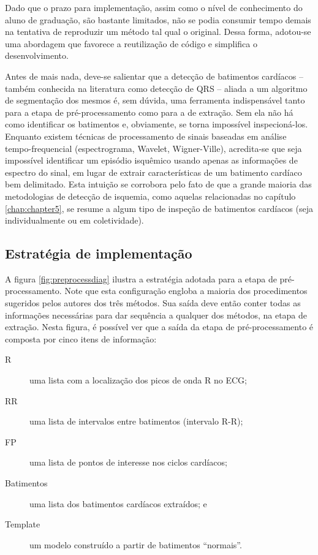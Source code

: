 Dado que o prazo para implementação, assim como o nível de conhecimento do aluno de graduação, são bastante limitados, não se podia consumir tempo demais na tentativa de reproduzir um método tal qual o original. Dessa forma, adotou-se uma abordagem que favorece a reutilização de código e simplifica o desenvolvimento.

Antes de mais nada, deve-se salientar que a detecção de batimentos cardíacos -- também conhecida na literatura como detecção de QRS -- aliada a um algoritmo de segmentação dos mesmos é, sem dúvida, uma ferramenta indispensável tanto para a etapa de pré-processamento como para a de extração. Sem ela não há como identificar os batimentos e, obviamente, se torna impossível inspecioná-los. Enquanto existem técnicas de processamento de sinais baseadas em análise tempo-frequencial (espectrograma, Wavelet, Wigner-Ville), acredita-se que seja impossível identificar um episódio isquêmico usando apenas as informações de espectro do sinal, em lugar de extrair características de um batimento cardíaco bem delimitado. Esta intuição se corrobora pelo fato de que a grande maioria das metodologias de detecção de isquemia, como aquelas relacionadas no capítulo \ref{chap:chapter5}, se resume a algum tipo de inspeção de batimentos cardíacos (seja individualmente ou em coletividade).

\subsection*{Estratégia de implementação}

A figura \ref{fig:preprocessdiag} ilustra a estratégia adotada para a etapa de pré-processamento. Note que esta configuração engloba a maioria dos procedimentos sugeridos pelos autores dos três métodos. Sua saída deve então conter todas as informações necessárias para dar sequência a qualquer dos métodos, na etapa de extração. Nesta figura, é possível ver que a saída da etapa de pré-processamento é composta por cinco itens de informação:
\begin{description}
    \item[R] uma lista com a localização dos picos de onda R no ECG;
    \item[RR] uma lista de intervalos entre batimentos (intervalo R-R);
    \item[FP] uma lista de pontos de interesse nos ciclos cardíacos;
    \item[Batimentos] uma lista dos batimentos cardíacos extraídos; e
    \item[Template] um modelo construído a partir de batimentos ``normais''.
\end{description}

